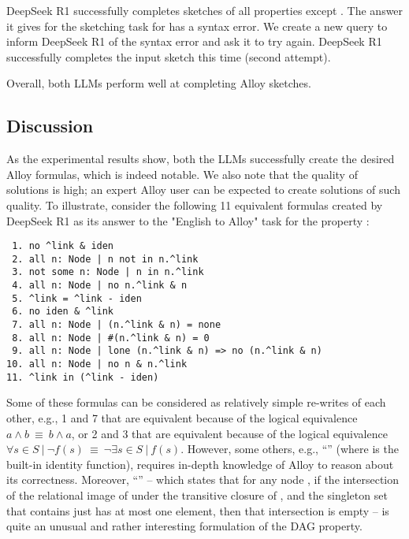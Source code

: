 DeepSeek R1 successfully completes sketches of all properties except . The answer it gives for the sketching task for  has a syntax error.  We create a new query to inform DeepSeek R1 of the syntax error and ask it to try again.  DeepSeek R1 successfully completes the input sketch this time (second attempt).

Overall, both LLMs perform well at completing Alloy sketches.

\subsection{Discussion}

As the experimental results show, both the LLMs successfully create the desired Alloy formulas, which is indeed notable. We also note that the quality of solutions is high; an expert Alloy user can be expected to create solutions of such quality.  To illustrate, consider the following 11 equivalent formulas created by DeepSeek R1 as its answer to the "English to Alloy" task for the property :

\begin{CodeOut}
\begin{verbatim}
 1. no ^link & iden
 2. all n: Node | n not in n.^link
 3. not some n: Node | n in n.^link
 4. all n: Node | no n.^link & n
 5. ^link = ^link - iden
 6. no iden & ^link
 7. all n: Node | (n.^link & n) = none
 8. all n: Node | #(n.^link & n) = 0
 9. all n: Node | lone (n.^link & n) => no (n.^link & n)
10. all n: Node | no n & n.^link
11. ^link in (^link - iden)
\end{verbatim}
\end{CodeOut}

Some of these formulas can be considered as relatively simple re-writes of each other, e.g., \CodeIn{\#}1 and \CodeIn{\#}7 that are equivalent because of the logical equivalence $a\wedge b~\equiv~b\wedge a$, or \CodeIn{\#}2 and \CodeIn{\#}3 that are equivalent because of the logical equivalence $\forall s\in S~|~\neg f(s)~\equiv~\neg\exists s\in S~|~f(s)$.  However, some others, e.g., ``'' (where  is the built-in identity function), requires in-depth knowledge of Alloy to reason about its correctness.  Moreover, ``'' -- which states that for any node , if the intersection of the relational image of  under the transitive closure of , and the singleton set that contains just  has at most one element, then that intersection is empty -- is quite an unusual and rather interesting formulation of the DAG property.

